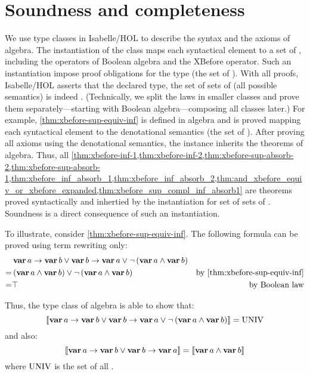 \section{Soundness and completeness}
\label{sec:algebras-soundness-and-completeness}

We use type classes in Isabelle/HOL to describe the syntax and the axioms of \ac{algebra}.
The instantiation of the class maps each syntactical element to a set of \distinctlists, including the operators of Boolean algebra and the \ac{XBefore} operator.
Such an instantiation impose proof obligations for the type (the set of \distinctlists).
With all proofs, Isabelle/HOL asserts that the declared type, the set of sets of \distinctlists (all possible semantics) is indeed .
(Technically, we split the laws in smaller classes and prove them separately---starting with Boolean algebra---composing all classes later.)
For example, \cref{thm:xbefore-sup-equiv-inf} is defined in \ac{algebra} and is proved mapping each syntactical element to the denotational semantics (the set of \distinctlists).
After proving all axioms using the denotational semantics, the instance inherits the theorems of \ac{algebra}.
Thus, all \cref{thm:xbefore-inf-1,thm:xbefore-inf-2,thm:xbefore-sup-absorb-2,thm:xbefore-sup-absorb-1,thm:xbefore_inf_absorb_1,thm:xbefore_inf_absorb_2,thm:and_xbefore_equiv_or_xbefore_expanded,thm:xbefore_sup_compl_inf_absorb1} are theorems proved syntactically and inhertied by the instantiation for set of sets of \distinctlists.
Soundness is a direct consequence of such an instantiation.

To illustrate, consider \cref{thm:xbefore-sup-equiv-inf}.
The following formula can be proved using term rewriting only:
%
\begin{align*}
& \xbefore{\var{a}}{\var{b}} \lor 
	\xbefore{\var{b}}{\var{a}} \lor 
	\lnot \left(\var{a} \land \var{b}\right)\nonumber\\
= & \left(\var{a} \land \var{b}\right) \lor 
	\lnot \left(\var{a} \land \var{b} \right) 
	& \text{by \cref{thm:xbefore-sup-equiv-inf}}\nonumber\\
= & \top & \text{by Boolean law}
\end{align*}

Thus, the type class of \ac{algebra} is able to show that:
\[
\left[\!\left[\operatorname{\mathbf{var}} a \rightarrow \operatorname{\mathbf{var}} b \lor 
	\operatorname{\mathbf{var}} b \rightarrow \operatorname{\mathbf{var}} a \lor 
	\lnot \left(\operatorname{\mathbf{var}} a \land \operatorname{\mathbf{var}} b\right)\right]\!\right] = \operatorname{UNIV}
\]
%
and also:
%
\[
\left[\!\left[\operatorname{\mathbf{var}} a \rightarrow \operatorname{\mathbf{var}} b \lor \operatorname{\mathbf{var}} b \rightarrow \operatorname{\mathbf{var}} a\right]\!\right] =
\left[\!\left[\operatorname{\mathbf{var}} a \land \operatorname{\mathbf{var}} b\right]\!\right]
\]
%
where $\operatorname{UNIV}$ is the set of all \distinctlists.


